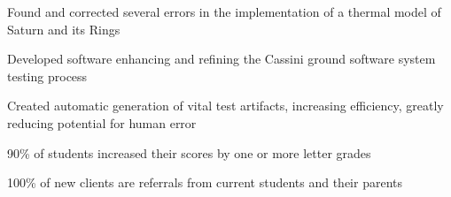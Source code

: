 \documentclass[letterpaper]{deedy-resume} %
\begin{document}
\begin{minipage}[t]{0.66\textwidth}
\vspace{7pt}


\begin{tightitemize}
\item Found and corrected several errors in the implementation of a thermal model of Saturn and its Rings
\item Developed software enhancing and refining the Cassini ground software system testing process
\item Created automatic generation of vital test artifacts, increasing efficiency, greatly reducing potential for human error
\end{tightitemize}

\vspace{7pt} %



\begin{tightitemize}
\item 90\% of students increased their scores by one or more letter grades
\item 100\% of new clients are referrals from current students and their parents
\end{tightitemize}

\vspace{7pt} %


\end{minipage}
\end{document}
